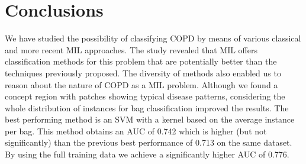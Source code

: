\documentclass[10pt,conference,a4paper]{IEEEtran}
\begin{document}
\section{Conclusions}\label{sec:conclusion}

We have studied the possibility of classifying COPD by means of various classical and more recent MIL approaches. The study revealed that MIL offers classification methods for this problem that are potentially better than the techniques previously proposed.  The diversity of methods also enabled us to reason about the nature of COPD as a MIL problem. Although we found a concept region with patches showing typical disease patterns, considering the whole distribution of instances for bag classification improved the results. The best performing method is an SVM with a kernel based on the average instance per bag. This method obtains an AUC of 0.742 which is higher (but not significantly) than the previous best performance of 0.713 on the same dataset. By using the full training data we achieve a significantly higher AUC of 0.776.













\end{document}
